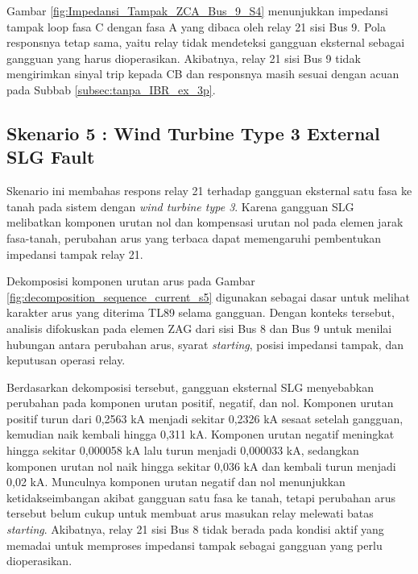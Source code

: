 Gambar \ref{fig:Impedansi_Tampak_ZCA_Bus_9_S4} menunjukkan impedansi tampak loop fasa C dengan fasa A yang dibaca oleh relay 21 sisi Bus 9. Pola responsnya tetap sama, yaitu relay tidak mendeteksi gangguan eksternal sebagai gangguan yang harus dioperasikan. Akibatnya, relay 21 sisi Bus 9 tidak mengirimkan sinyal trip kepada CB dan responsnya masih sesuai dengan acuan pada Subbab \ref{subsec:tanpa_IBR_ex_3p}.







\subsection{Skenario 5 : Wind Turbine Type 3 External SLG Fault}

Skenario ini membahas respons relay 21 terhadap gangguan eksternal satu fasa ke tanah pada sistem dengan \textit{wind turbine type 3}. Karena gangguan SLG melibatkan komponen urutan nol dan kompensasi urutan nol pada elemen jarak fasa-tanah, perubahan arus yang terbaca dapat memengaruhi pembentukan impedansi tampak relay 21.

Dekomposisi komponen urutan arus pada Gambar \ref{fig:decomposition_sequence_current_s5} digunakan sebagai dasar untuk melihat karakter arus yang diterima TL89 selama gangguan. Dengan konteks tersebut, analisis difokuskan pada elemen ZAG dari sisi Bus 8 dan Bus 9 untuk menilai hubungan antara perubahan arus, syarat \textit{starting}, posisi impedansi tampak, dan keputusan operasi relay.

Berdasarkan dekomposisi tersebut, gangguan eksternal SLG menyebabkan perubahan pada komponen urutan positif, negatif, dan nol. Komponen urutan positif turun dari 0,2563 kA menjadi sekitar 0,2326 kA sesaat setelah gangguan, kemudian naik kembali hingga 0,311 kA. Komponen urutan negatif meningkat hingga sekitar 0,000058 kA lalu turun menjadi 0,000033 kA, sedangkan komponen urutan nol naik hingga sekitar 0,036 kA dan kembali turun menjadi 0,02 kA. Munculnya komponen urutan negatif dan nol menunjukkan ketidakseimbangan akibat gangguan satu fasa ke tanah, tetapi perubahan arus tersebut belum cukup untuk membuat arus masukan relay melewati batas \textit{starting}. Akibatnya, relay 21 sisi Bus 8 tidak berada pada kondisi aktif yang memadai untuk memproses impedansi tampak sebagai gangguan yang perlu dioperasikan.

